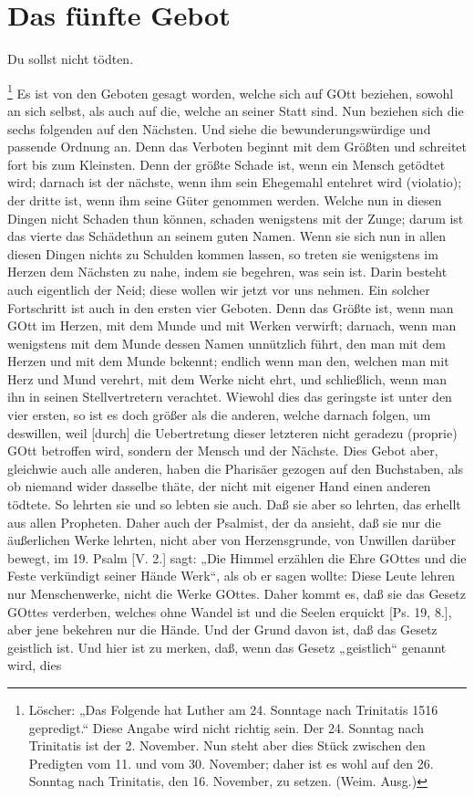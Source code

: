 \section{Das fünfte Gebot}

\begin{schriftzitat}
Du sollst nicht tödten.
\end{schriftzitat}

\footnote{Löscher: „Das Folgende hat Luther am 24. Sonntage nach Trinitatis 1516 gepredigt.“ Diese Angabe wird nicht richtig sein. Der 24. Sonntag nach Trinitatis ist der 2. November. Nun steht aber dies Stück zwischen den Predigten vom 11. und vom 30. November; daher ist es wohl auf den 26. Sonntag nach Trinitatis, den 16. November, zu setzen. (Weim. Ausg.)} Es ist von den Geboten gesagt worden, welche sich auf GOtt beziehen, sowohl an sich selbst, als auch auf die, welche an seiner Statt sind. Nun beziehen sich die sechs folgenden auf den Nächsten. Und siehe die bewunderungswürdige und passende Ordnung an. Denn das Verboten beginnt mit dem Größten und schreitet fort bis zum Kleinsten. Denn der größte Schade ist, wenn ein Mensch getödtet wird; darnach ist der nächste, wenn ihm sein Ehegemahl entehret wird (violatio); der dritte ist, wenn ihm seine Güter genommen werden. Welche nun in diesen Dingen nicht Schaden thun können, schaden wenigstens mit der Zunge; darum ist das vierte das Schädethun an seinem guten Namen. Wenn sie sich nun in allen diesen Dingen nichts zu Schulden kommen lassen, so treten sie wenigstens im Herzen dem Nächsten zu nahe, indem sie begehren, was sein ist. Darin besteht auch eigentlich der Neid; diese wollen wir jetzt vor uns nehmen. Ein solcher Fortschritt ist auch in den ersten vier Geboten. Denn das Größte ist, wenn man GOtt im Herzen, mit dem Munde und mit Werken verwirft; darnach, wenn man wenigstens mit dem Munde dessen Namen unnützlich führt, den man mit dem Herzen und mit dem Munde bekennt; endlich wenn man den, welchen man mit Herz und Mund verehrt, mit dem Werke nicht ehrt, und schließlich, wenn man ihn in seinen Stellvertretern verachtet. Wiewohl dies das geringste ist unter den vier ersten, so ist es doch größer als die anderen, welche darnach folgen, um deswillen, weil [durch] die Uebertretung dieser letzteren nicht geradezu (proprie) GOtt betroffen wird, sondern der Mensch und der Nächste. Dies Gebot aber, gleichwie auch alle anderen, haben die Pharisäer gezogen auf den Buchstaben, als ob niemand wider dasselbe thäte, der nicht mit eigener Hand einen anderen tödtete. So lehrten sie und so lebten sie auch. Daß sie aber so lehrten, das erhellt aus allen Propheten. Daher auch der Psalmist, der da ansieht, daß sie nur die äußerlichen Werke lehrten, nicht aber von Herzensgrunde, von Unwillen darüber bewegt, im 19. Psalm [V. 2.] sagt: „Die Himmel erzählen die Ehre GOttes und die Feste verkündigt seiner Hände Werk“, als ob er sagen wollte: Diese Leute lehren nur Menschenwerke, nicht die Werke GOttes. Daher kommt es, daß sie das Gesetz GOttes verderben, welches ohne Wandel ist und die Seelen erquickt [Ps. 19, 8.], aber jene bekehren nur die Hände. Und der Grund davon ist, daß das Gesetz geistlich ist. Und hier ist zu merken, daß, wenn das Gesetz „geistlich“ genannt wird, dies 